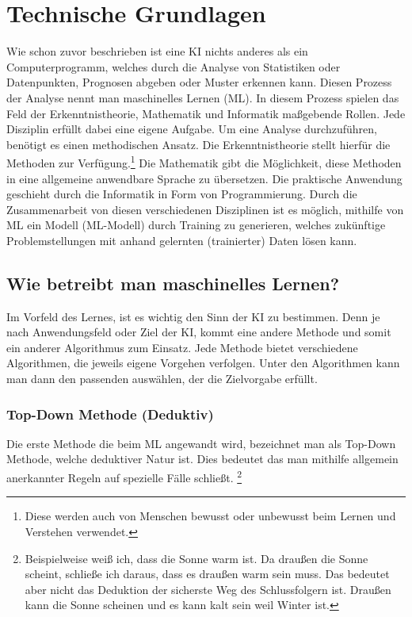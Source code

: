 \documentclass[12pt,german,ngerman]{report}
\begin{document}
\chapter{Technische Grundlagen}
     Wie schon zuvor beschrieben ist eine KI nichts anderes als ein Computerprogramm,
     welches durch die Analyse von Statistiken oder Datenpunkten, Prognosen abgeben oder Muster erkennen kann.
     Diesen Prozess der Analyse nennt man maschinelles Lernen (ML).
     In diesem Prozess spielen das Feld der Erkenntnistheorie, Mathematik und Informatik 
     maßgebende Rollen. Jede Disziplin erfüllt dabei eine eigene Aufgabe.
     Um eine Analyse durchzuführen, benötigt es einen methodischen Ansatz.
     Die Erkenntnistheorie stellt hierfür die Methoden zur Verfügung.\footnote{Diese werden auch von 
     Menschen bewusst oder unbewusst beim Lernen und Verstehen verwendet.}
     Die Mathematik gibt die Möglichkeit, diese Methoden in eine allgemeine anwendbare Sprache zu übersetzen.
     Die praktische Anwendung geschieht durch die Informatik in Form von Programmierung.
     Durch die Zusammenarbeit von diesen verschiedenen Disziplinen ist es
     möglich, mithilfe von ML ein Modell (ML-Modell) durch Training zu generieren,
     welches zukünftige Problemstellungen mit anhand gelernten (trainierter) Daten lösen kann.
        
    \section{Wie betreibt man maschinelles Lernen?}
        Im Vorfeld des Lernes, ist es wichtig den Sinn der KI zu bestimmen.
        Denn je nach Anwendungsfeld oder Ziel der KI, kommt eine andere Methode und somit
        ein anderer Algorithmus zum Einsatz. Jede Methode bietet verschiedene Algorithmen,
        die jeweils eigene Vorgehen verfolgen. Unter den Algorithmen kann man
        dann den passenden auswählen, der die Zielvorgabe erfüllt.

    \newpage    

    \subsection{Top-Down Methode (Deduktiv)}
        Die erste Methode die beim ML angewandt wird, bezeichnet man als Top-Down Methode,
        welche deduktiver Natur ist. Dies bedeutet das man mithilfe  allgemein anerkannter Regeln
        auf spezielle Fälle schließt.\cite{dundi2021unileipzig} 
        \footnote{Beispielweise weiß ich, dass die Sonne warm ist. Da draußen die Sonne scheint, schließe ich daraus,
        dass es draußen warm sein muss. Das bedeutet aber nicht das Deduktion der sicherste Weg des 
        Schlussfolgern ist. Draußen kann die Sonne scheinen und es kann kalt sein weil Winter ist.}\\
\end{document}
